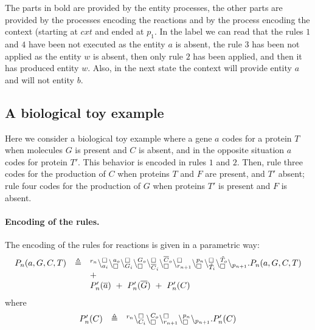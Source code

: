 The parts in bold are provided by the entity processes, the other parts are provided by the processes encoding the reactions and by the process encoding the context (starting at $cxt$ and ended at $p_1$.
In the label we can read that the rules $1$ and $4$ have been not executed as the entity $a$ is absent, 
the rule $3$ has been not applied as the entity $w$ is absent, then only rule $2$ has been applied, and then it has produced entity $w$. Also, in the next state the context will provide entity $a$ and will not entity $b$.

\subsection{A  biological toy example}
Here we consider a biological toy example where a gene $a$  codes for a protein $T$ when molecules 
$G$ is present and $C$ is absent, and in the opposite situation $a$ codes for protein $T'$.
This behavior is encoded in rules $1$ and $2$.
Then, rule three codes for the production of $C$ when proteins $T$ and $F$ are present, and $T'$ absent;
rule four codes for the production of $G$ when  proteins $T'$ is present and $F$ is absent.
\paragraph{Encoding of the rules.}
The encoding of the rules for reactions is  given in a parametric way:
\[
\begin{array}{lcl}
P_n(a,G,C,T) & \triangleq &{}^{r_n}\backslash_{a_i}^{\scriptstyle {\square}}\backslash_{\scriptstyle {\square}}^{a_o}
                                                    \backslash_{G_i}^{\scriptstyle {\square}}\backslash_{\scriptstyle {\square}}^{G_o}
                                                     \backslash_{\overline{C}_i}^{\scriptstyle {\square}}\backslash_{\scriptstyle {\square}}^{\overline{C}_o}
					        \backslash_{r_{n+1}}^{\scriptstyle {\square}}\backslash_{\scriptstyle {\square}}^{p_n}
					        \backslash_{\tilde{T}_i}^{\scriptstyle {\square}}\backslash_{\scriptstyle {\square}}^{\tilde{T}_o}
			\backslash_{p_{n+1}}.P_n(a,G,C,T)  \\
				&& +\\
			&&P_n'(\overline{a}) \ +\ P_n'(\overline{G}) \ + \ P_n'(C)\\
			\end{array}
			\]
			\noindent
			where
			\[
\begin{array}{lcl}
P_n'(C) &\triangleq &  {}^{r_n}\backslash_{C_i}^{\scriptstyle {\square}}\backslash_{\scriptstyle {\square}}^{C_o}\backslash_{r_{n+1}}^{\scriptstyle {\square}}\backslash_{\scriptstyle {\square}}^{p_n} \backslash_{p_{n+1}}.P_n'(C) 
\end{array}
\]

